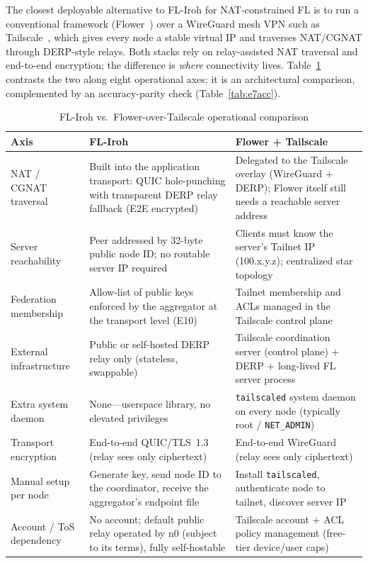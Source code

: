 
The closest deployable alternative to FL-Iroh for NAT-constrained FL is to run a conventional framework (Flower~\cite{flower2022}) over a WireGuard mesh VPN such as Tailscale~\cite{tailscale2023}, which gives every node a stable virtual IP and traverses NAT\slash CGNAT through DERP-style relays. Both stacks rely on relay-assisted NAT traversal and end-to-end encryption; the difference is \emph{where} connectivity lives. Table~\ref{tab:e7} contrasts the two along eight operational axes; it is an architectural comparison, complemented by an accuracy-parity check (Table~\ref{tab:e7acc}).

\begin{table}[t]
\centering
\caption{FL-Iroh vs.\ Flower-over-Tailscale operational comparison}
\label{tab:e7}
\footnotesize
\renewcommand{\arraystretch}{1.25}
\setlength{\tabcolsep}{4pt}
\begin{tabular}{p{2.4cm} p{6.2cm} p{6.2cm}}
\toprule
\textbf{Axis} & \textbf{FL-Iroh} & \textbf{Flower + Tailscale} \\
\midrule
NAT / CGNAT traversal & Built into the application transport: QUIC hole-punching with transparent DERP relay fallback (E2E encrypted) & Delegated to the Tailscale overlay (WireGuard + DERP); Flower itself still needs a reachable server address \\
Server reachability & Peer addressed by 32-byte public node ID; no routable server IP required & Clients must know the server's Tailnet IP (100.x.y.z); centralized star topology \\
Federation membership & Allow-list of public keys enforced by the aggregator at the transport level (E10) & Tailnet membership and ACLs managed in the Tailscale control plane \\
External infrastructure & Public or self-hosted DERP relay only (stateless, swappable) & Tailscale coordination server (control plane) $+$ DERP $+$ long-lived FL server process \\
Extra system daemon & None---userspace library, no elevated privileges & \texttt{tailscaled} system daemon on every node (typically root / \texttt{NET\_ADMIN}) \\
Transport encryption & End-to-end QUIC/TLS~1.3 (relay sees only ciphertext) & End-to-end WireGuard (relay sees only ciphertext) \\
Manual setup per node & Generate key, send node ID to the coordinator, receive the aggregator's endpoint file & Install \texttt{tailscaled}, authenticate node to tailnet, discover server IP \\
Account / ToS dependency & No account; default public relay operated by n0 (subject to its terms), fully self-hostable & Tailscale account $+$ ACL policy management (free-tier device/user caps) \\
\bottomrule
\end{tabular}
\end{table}

